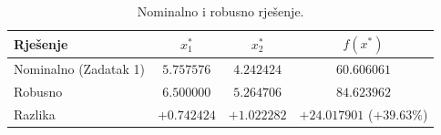 \begin{table}[H]
\centering
\caption{Nominalno i robusno rješenje.}
\label{tab:rob_usporedba}
\begin{tabular}{lccc}
\toprule
\textbf{Rješenje} & $x_1^*$ & $x_2^*$ & $f(x^*)$ \\
\midrule
Nominalno (Zadatak 1) & $5.757576$ & $4.242424$ & $60.606061$ \\
Robusno               & $6.500000$ & $5.264706$ & $84.623962$ \\
\midrule
Razlika               & $+0.742424$ & $+1.022282$ & $+24.017901$ ($+39.63\%$) \\
\bottomrule
\end{tabular}
\end{table}
